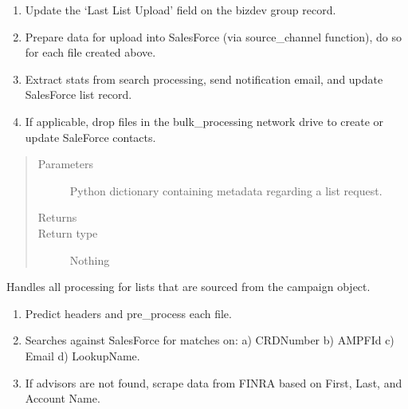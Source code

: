 \documentclass[letterpaper,10pt,english]{sphinxmanual}
\begin{document}
\begin{fulllineitems}
\begin{fulllineitems}
\begin{enumerate}
\item {} 
Update the ‘Last List Upload’ field on the bizdev group record.

\item {} 
Prepare data for upload into SalesForce (via source\_channel function), do so for each file created above.

\item {} 
Extract stats from search processing, send notification email, and update SalesForce list record.

\item {} 
If applicable, drop files in the bulk\_processing network drive to create or update SaleForce contacts.

\end{enumerate}
\begin{quote}\begin{description}
\item[{Parameters}] \leavevmode
{} \textendash{} Python dictionary containing metadata regarding a list request.

\item[{Returns}] \leavevmode


\item[{Return type}] \leavevmode
Nothing

\end{description}\end{quote}

\end{fulllineitems}


\begin{fulllineitems}
\label{\detokenize{index:ListManagement.list_processing.ListProcessing.campaign_processing}}
Handles all processing for lists that are sourced from the campaign object.
\begin{enumerate}
\def\theenumi{\arabic{enumi}}
\def\labelenumi{\theenumi )}
\makeatletter\def\p@enumii{\p@enumi \theenumi )}\makeatother
\item {} 
Predict headers and pre\_process each file.

\item {} 
Searches against SalesForce for matches on: a) CRDNumber b) AMPFId c) Email d) LookupName.

\item {} 
If advisors are not found, scrape data from FINRA based on First, Last, and Account Name.


\end{enumerate}
\end{fulllineitems}
\end{fulllineitems}
\end{document}
